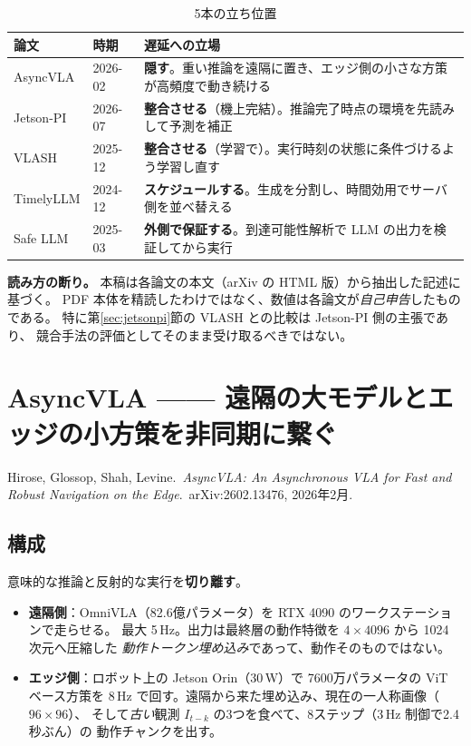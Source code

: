 \documentclass[11pt,a4paper]{article}
\newcommand{\keyp}[1]{\textbf{\textcolor{blue!45!black}{#1}}}
\begin{document}
\begin{table}[htbp]
\centering
\small
\caption{5本の立ち位置}
\label{tab:pos}
\begin{tabularx}{\textwidth}{@{}l l X@{}}
\toprule
\textbf{論文} & \textbf{時期} & \textbf{遅延への立場} \\
\midrule
AsyncVLA   & 2026-02 & \textbf{隠す}。重い推論を遠隔に置き、エッジ側の小さな方策が高頻度で動き続ける \\
Jetson-PI  & 2026-07 & \textbf{整合させる}（機上完結）。推論完了時点の環境を先読みして予測を補正 \\
VLASH      & 2025-12 & \textbf{整合させる}（学習で）。実行時刻の状態に条件づけるよう学習し直す \\
TimelyLLM  & 2024-12 & \textbf{スケジュールする}。生成を分割し、時間効用でサーバ側を並べ替える \\
Safe LLM   & 2025-03 & \textbf{外側で保証する}。到達可能性解析で LLM の出力を検証してから実行 \\
\bottomrule
\end{tabularx}
\end{table}

\medskip
\noindent
\textbf{読み方の断り。} 本稿は各論文の本文（arXiv の HTML 版）から抽出した記述に基づく。
PDF 本体を精読したわけではなく、数値は各論文が\emph{自己申告}したものである。
特に第\ref{sec:jetsonpi}節の VLASH との比較は Jetson-PI 側の主張であり、
競合手法の評価としてそのまま受け取るべきではない。

\section{AsyncVLA —— 遠隔の大モデルとエッジの小方策を非同期に繋ぐ}

\noindent
Hirose, Glossop, Shah, Levine.\ \emph{AsyncVLA: An Asynchronous VLA for Fast and Robust
Navigation on the Edge}.\ arXiv:2602.13476, 2026年2月.

\subsection*{構成}

意味的な推論と反射的な実行を\keyp{切り離す}。

\begin{itemize}[leftmargin=1.4em,itemsep=2pt]
  \item \textbf{遠隔側}：OmniVLA（82.6億パラメータ）を RTX 4090 のワークステーションで走らせる。
        最大 5\,Hz。出力は最終層の動作特徴を $4\times4096$ から 1024 次元へ圧縮した
        \emph{動作トークン埋め込み}であって、動作そのものではない。
  \item \textbf{エッジ側}：ロボット上の Jetson Orin（30\,W）で 7600万パラメータの
        ViT ベース方策を 8\,Hz で回す。遠隔から来た埋め込み、現在の一人称画像（$96\times96$）、
        そして\emph{古い}観測 $I_{t-k}$ の3つを食べて、8ステップ（3\,Hz 制御で2.4秒ぶん）の
        動作チャンクを出す。
\end{itemize}
\end{document}
